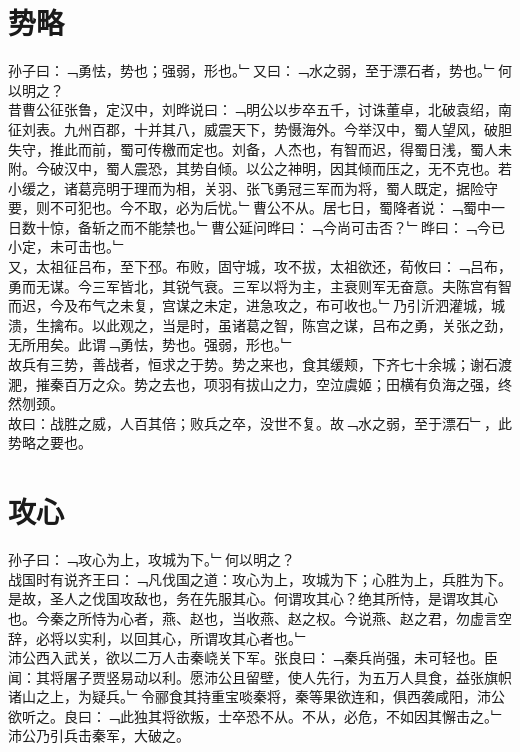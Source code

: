 \chapter{势略}%
孙子曰：﹁勇怯，势也；强弱，形也。﹂又曰：﹁水之弱，至于漂石者，势也。﹂何以明之？\\
昔曹公征张鲁，定汉中，刘晔说曰：﹁明公以步卒五千，讨诛董卓，北破袁绍，南征刘表。九州百郡，十并其八，威震天下，势慑海外。今举汉中，蜀人望风，破胆失守，推此而前，蜀可传檄而定也。刘备，人杰也，有智而迟，得蜀日浅，蜀人未附。今破汉中，蜀人震恐，其势自倾。以公之神明，因其倾而压之，无不克也。若小缓之，诸葛亮明于理而为相，关羽、张飞勇冠三军而为将，蜀人既定，据险守要，则不可犯也。今不取，必为后忧。﹂曹公不从。居七日，蜀降者说：﹁蜀中一日数十惊，备斩之而不能禁也。﹂曹公延问晔曰：﹁今尚可击否？﹂晔曰：﹁今已小定，未可击也。﹂\\
又，太祖征吕布，至下邳。布败，固守城，攻不拔，太祖欲还，荀攸曰：﹁吕布，勇而无谋。今三军皆北，其锐气衰。三军以将为主，主衰则军无奋意。夫陈宫有智而迟，今及布气之未复，宫谋之未定，进急攻之，布可收也。﹂乃引沂泗灌城，城溃，生擒布。以此观之，当是时，虽诸葛之智，陈宫之谋，吕布之勇，关张之劲，无所用矣。此谓﹁勇怯，势也。强弱，形也。﹂\\
故兵有三势，善战者，恒求之于势。势之来也，食其缓颊，下齐七十余城；谢石渡淝，摧秦百万之众。势之去也，项羽有拔山之力，空泣虞姬；田横有负海之强，终然刎颈。\\
故曰：战胜之威，人百其倍；败兵之卒，没世不复。故﹁水之弱，至于漂石﹂，此势略之要也。
%
%
\chapter{攻心}%
孙子曰：﹁攻心为上，攻城为下。﹂何以明之？\\
战国时有说齐王曰：﹁凡伐国之道：攻心为上，攻城为下；心胜为上，兵胜为下。是故，圣人之伐国攻敌也，务在先服其心。何谓攻其心？绝其所恃，是谓攻其心也。今秦之所恃为心者，燕、赵也，当收燕、赵之权。今说燕、赵之君，勿虚言空辞，必将以实利，以回其心，所谓攻其心者也。﹂\\
沛公西入武关，欲以二万人击秦峣关下军。张良曰：﹁秦兵尚强，未可轻也。臣闻：其将屠子贾竖易动以利。愿沛公且留壁，使人先行，为五万人具食，益张旗帜诸山之上，为疑兵。﹂令郦食其持重宝啖秦将，秦等果欲连和，俱西袭咸阳，沛公欲听之。良曰：﹁此独其将欲叛，士卒恐不从。不从，必危，不如因其懈击之。﹂沛公乃引兵击秦军，大破之。
%
%
